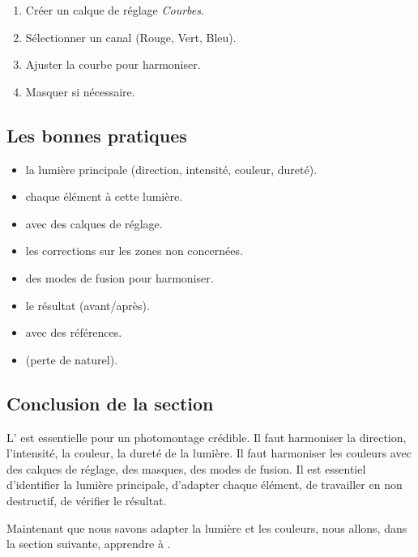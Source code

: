 \begin{enumerate}
    \item Créer un calque de réglage \emph{Courbes}.
    \item Sélectionner un canal (Rouge, Vert, Bleu).
    \item Ajuster la courbe pour harmoniser.
    \item Masquer si nécessaire.
\end{enumerate}

\subsection{Les bonnes pratiques}

\begin{itemize}
    \item {} la lumière principale (direction, intensité, couleur, dureté).
    \item {} chaque élément à cette lumière.
    \item {} avec des calques de réglage.
    \item {} les corrections sur les zones non concernées.
    \item {} des modes de fusion pour harmoniser.
    \item {} le résultat (avant/après).
    \item {} avec des références.
    \item {} (perte de naturel).
\end{itemize}

\subsection*{Conclusion de la section}

L' est essentielle pour un photomontage crédible. Il faut harmoniser la direction, l'intensité, la couleur, la dureté de la lumière. Il faut harmoniser les couleurs avec des calques de réglage, des masques, des modes de fusion. Il est essentiel d'identifier la lumière principale, d'adapter chaque élément, de travailler en non destructif, de vérifier le résultat.

Maintenant que nous savons adapter la lumière et les couleurs, nous allons, dans la section suivante, apprendre à .

